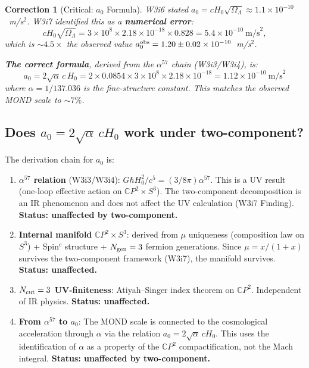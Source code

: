\documentclass[11pt]{article}
\newtheorem{correction}{Correction}
\newcommand{\ee}[1]{\times 10^{#1}}
\newcommand{\aM}{a_0}
\newcommand{\Hzero}{H_0}
\newcommand{\mufd}{\mu}
\newcommand{\CP}{\mathbb{C}P}
\newcommand{\OmL}{\Omega_\Lambda}
\begin{document}
\begin{correction}[Critical: $\aM$ Formula]
\label{corr:a0}
W3i6 stated $\aM = c\Hzero\sqrt{\OmL} \approx 1.1\ee{-10}$~m/s$^2$.
W3i7 identified this as a \textbf{numerical error}:
\begin{equation}
c\Hzero\sqrt{\OmL} = 3\ee{8}\times 2.18\ee{-18}\times 0.828
= 5.4\ee{-10}~\text{m/s}^2,
\end{equation}
which is $\sim 4.5\times$ the observed value
$\aM^{\rm obs} = 1.20 \pm 0.02\ee{-10}$~m/s$^2$.

\textbf{The correct formula}, derived from the $\alpha^{57}$ chain
(W3i3/W3i4), is:
\begin{equation}
\boxed{\aM = 2\sqrt{\alpha}\,c\,\Hzero
= 2\times 0.0854\times 3\ee{8}\times 2.18\ee{-18}
= 1.12\ee{-10}~\text{m/s}^2}
\label{eq:a0-correct}
\end{equation}
where $\alpha = 1/137.036$ is the fine-structure constant. This
matches the observed MOND scale to $\sim 7\%$.
\end{correction}

\subsection{Does $\aM = 2\sqrt{\alpha}\,c\Hzero$ work under
two-component?}

The derivation chain for $\aM$ is:

\begin{enumerate}[nosep]
\item \textbf{$\alpha^{57}$ relation} (W3i3/W3i4):
  $G\hbar\Hzero^2/c^5 = (3/8\pi)\alpha^{57}$.
  This is a UV result (one-loop effective action on $\CP^2 \times S^3$).
  The two-component decomposition is an IR phenomenon and does not
  affect the UV calculation (W3i7 Finding).
  \textbf{Status: unaffected by two-component.}

\item \textbf{Internal manifold} $\CP^2 \times S^3$: derived from
  $\mufd$ uniqueness (composition law on $S^3$) + Spin$^c$ structure
  + $N_{\rm gen} = 3$ fermion generations. Since $\mufd = x/(1+x)$
  survives the two-component framework (W3i7), the manifold survives.
  \textbf{Status: unaffected.}

\item \textbf{$N_{\rm cut} = 3$ UV-finiteness}: Atiyah--Singer index
  theorem on $\CP^2$. Independent of IR physics.
  \textbf{Status: unaffected.}

\item \textbf{From $\alpha^{57}$ to $\aM$}: The MOND scale is
  connected to the cosmological acceleration through $\alpha$ via the
  relation $\aM = 2\sqrt{\alpha}\,c\Hzero$. This uses the identification
  of $\alpha$ as a property of the $\CP^2$ compactification, not the
  Mach integral.
  \textbf{Status: unaffected by two-component.}
\end{enumerate}
\end{document}
